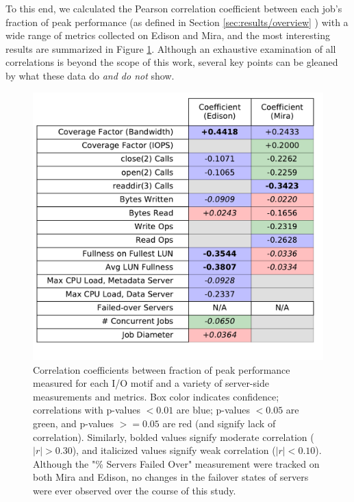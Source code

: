 {To this end, we calculated the Pearson correlation coefficient between each job's fraction of peak performance (as defined in Section \ref{sec:results/overview} ) with a wide range of metrics collected on Edison and Mira, and the most interesting results are summarized in Figure \ref{fig:correlation-table}.
Although an exhaustive examination of all correlations is beyond the scope of this work, several key points can be gleaned by what these data do \emph{and do not} show.

\begin{figure}[t]
    \centering
    \includegraphics[width=\columnwidth]{figs/correlation_table.pdf}
    \caption{Correlation coefficients between fraction of peak performance measured for each I/O motif and a variety of server-side measurements and metrics.  Box color indicates confidence; correlations with p-values $< 0.01$ are blue; p-values $< 0.05$ are green, and p-values $>= 0.05$ are red (and signify lack of correlation).  Similarly, bolded values signify moderate correlation ($|r| > 0.30$), and italicized values signify weak correlation ($|r| < 0.10$).  Although the "\% Servers Failed Over" measurement were tracked on both Mira and Edison, no changes in the
    failover states of servers were ever observed over the course of this study.
    }
    \label{fig:correlation-table}
\end{figure}

\begin{itemize}


\end{itemize}}
